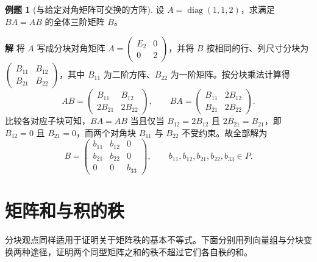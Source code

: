\documentclass[UTF8, fontset=fandol, a4paper, 12pt]{ctexart}
\newcommand{\diag}{\operatorname{diag}}
\theoremstyle{definition}
\newtheorem{example}[definition]{例题}
\begin{document}
\begin{example}[与给定对角矩阵可交换的方阵]
设 $A=\diag(1,1,2)$，求满足 $BA=AB$ 的全体三阶矩阵 $B$。
\end{example}
\noindent\textbf{解}\quad
将 $A$ 写成分块对角矩阵 $A=\begin{pmatrix}E_2&0\\0&2\end{pmatrix}$，并将 $B$ 按相同的行、列尺寸分块为 $\begin{pmatrix}B_{11}&B_{12}\\B_{21}&B_{22}\end{pmatrix}$，其中 $B_{11}$ 为二阶方阵、$B_{22}$ 为一阶矩阵。按分块乘法计算得
\[
 AB=\begin{pmatrix}B_{11}&B_{12}\\2B_{21}&2B_{22}\end{pmatrix},
 \qquad
 BA=\begin{pmatrix}B_{11}&2B_{12}\\B_{21}&2B_{22}\end{pmatrix}.
\]
比较各对应子块可知，$BA=AB$ 当且仅当 $B_{12}=2B_{12}$ 且 $2B_{21}=B_{21}$，即 $B_{12}=0$ 且 $B_{21}=0$，而两个对角块 $B_{11}$ 与 $B_{22}$ 不受约束。故全部解为
\[
 B=\begin{pmatrix}
 b_{11}&b_{12}&0\\
 b_{21}&b_{22}&0\\
 0&0&b_{33}
 \end{pmatrix},
 \qquad b_{11},b_{12},b_{21},b_{22},b_{33}\in P.
\]

\section{矩阵和与积的秩}

分块观点同样适用于证明关于矩阵秩的基本不等式。下面分别用列向量组与分块变换两种途径，证明两个同型矩阵之和的秩不超过它们各自秩的和。
\end{document}
